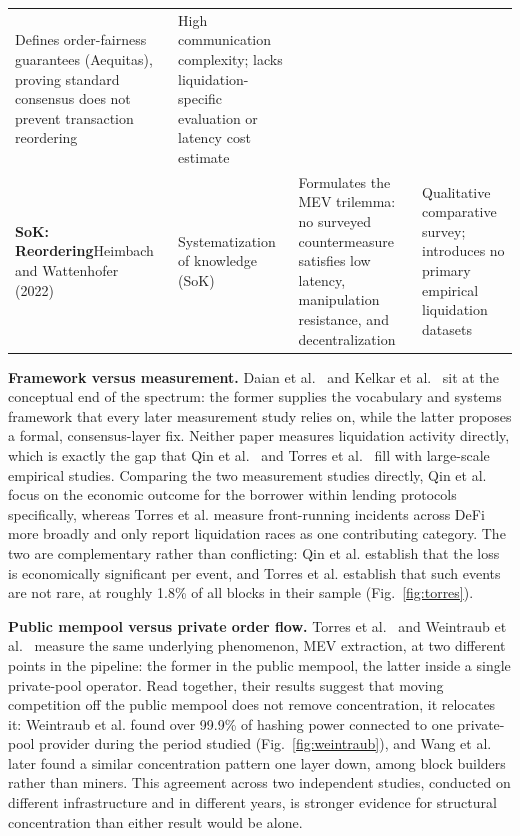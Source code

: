 \documentclass[conference]{IEEEtran}
\begin{document}
\begin{table}[!t]
\begin{tabular}{p{3.0cm}p{3.1cm}p{6.4cm}p{4.5cm}}
Defines order-fairness guarantees (Aequitas), proving standard consensus does not prevent transaction reordering &
High communication complexity; lacks liquidation-specific evaluation or latency cost estimate \\
\textbf{SoK: Reordering}\newline Heimbach and Wattenhofer~\cite{heimbach2022sok} (2022) &
Systematization of knowledge (SoK) &
Formulates the MEV trilemma: no surveyed countermeasure satisfies low latency, manipulation resistance, and decentralization &
Qualitative comparative survey; introduces no primary empirical liquidation datasets \\
\bottomrule
\end{tabular}
\end{table}

\textbf{Framework versus measurement.} Daian et al.~\cite{daian2019flash}
and Kelkar et al.~\cite{kelkar2020order} sit at the conceptual end of the
spectrum: the former supplies the vocabulary and systems framework that
every later measurement study relies on, while the latter proposes a
formal, consensus-layer fix. Neither paper measures liquidation activity
directly, which is exactly the gap that Qin et al.~\cite{qin2021empirical}
and Torres et al.~\cite{torres2021frontrunner} fill with large-scale
empirical studies. Comparing the two measurement studies directly,
Qin et al. focus on the economic outcome for the borrower within
lending protocols specifically, whereas Torres et al. measure
front-running incidents across DeFi more broadly and only report
liquidation races as one contributing category. The two are
complementary rather than conflicting: Qin et al. establish that the
loss is economically significant per event, and Torres et al. establish
that such events are not rare, at roughly 1.8\% of all blocks in their
sample (Fig.~\ref{fig:torres}).

\textbf{Public mempool versus private order flow.} Torres et
al.~\cite{torres2021frontrunner} and Weintraub et
al.~\cite{weintraub2022flashbot} measure the same underlying phenomenon,
MEV extraction, at two different points in the pipeline: the former in
the public mempool, the latter inside a single private-pool operator.
Read together, their results suggest that moving competition off the
public mempool does not remove concentration, it relocates it: Weintraub
et al. found over 99.9\% of hashing power connected to one private-pool
provider during the period studied (Fig.~\ref{fig:weintraub}), and
Wang et al.~\cite{wang2024private} later found a similar concentration
pattern one layer down, among block builders rather than miners. This
agreement across two independent studies, conducted on different
infrastructure and in different years, is stronger evidence for
structural concentration than either result would be alone.
\end{document}
